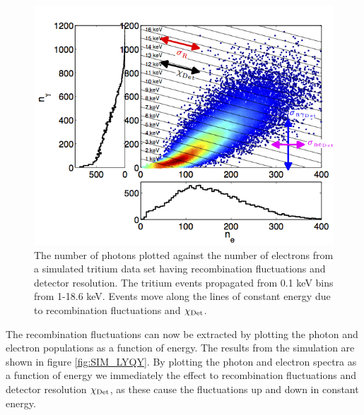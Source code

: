 \renewcommand{\baselinestretch}{1}
\small\normalsize
\begin{figure}[h!]\centering
\includegraphics[width=130mm]{Chapter_Flucs/Figures/EX_Plots/EX_T_Stat_R.png}
\caption{The number of photons plotted against the number of electrons from a simulated tritium data set having recombination fluctuations and detector resolution. The tritium events propagated from 0.1 keV bins from 1-18.6 keV. Events move along the lines of constant energy due to  recombination fluctuations and $\rm \chi_{Det}$.}
\label{fig:T_R_Stat}
\end{figure}
\renewcommand{\baselinestretch}{2}
\small\normalsize

The recombination fluctuations can now be extracted by plotting the photon and electron populations as a function of energy. The results from the simulation are shown in figure \ref{fig:SIM_LYQY}. By plotting the photon and electron spectra as a function of energy we immediately the effect to recombination fluctuations and detector resolution $\rm \chi_{Det}$, as these cause the fluctuations up and down in constant energy. 


